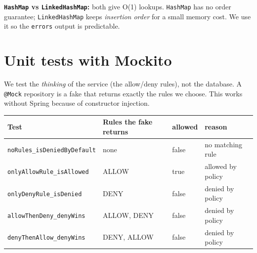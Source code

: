 \documentclass[11pt,a4paper]{article}
\newcommand{\code}[1]{\texttt{\small #1}}
\begin{document}
\textbf{\code{HashMap} vs \code{LinkedHashMap}:} both give O(1) lookups. \code{HashMap} has no
order guarantee; \code{LinkedHashMap} keeps \emph{insertion order} for a small memory cost.
We use it so the \code{errors} output is predictable.

\section{Unit tests with Mockito}

We test the \emph{thinking} of the service (the allow/deny rules), not the database. A
\code{@Mock} repository is a fake that returns exactly the rules we choose. This works
without Spring because of constructor injection.

\begin{center}
\end{center}

\begin{tabular}{@{}p{5.4cm}p{3.9cm}p{1.9cm}p{3.6cm}@{}}
\toprule
\textbf{Test} & \textbf{Rules the fake returns} & \textbf{allowed} & \textbf{reason} \\
\midrule
\code{noRules\_isDeniedByDefault} & none & false & no matching rule \\
\code{onlyAllowRule\_isAllowed} & ALLOW & true & allowed by policy \\
\code{onlyDenyRule\_isDenied} & DENY & false & denied by policy \\
\code{allowThenDeny\_denyWins} & ALLOW, DENY & false & denied by policy \\
\code{denyThenAllow\_denyWins} & DENY, ALLOW & false & denied by policy \\
\bottomrule
\end{tabular}
\end{document}
